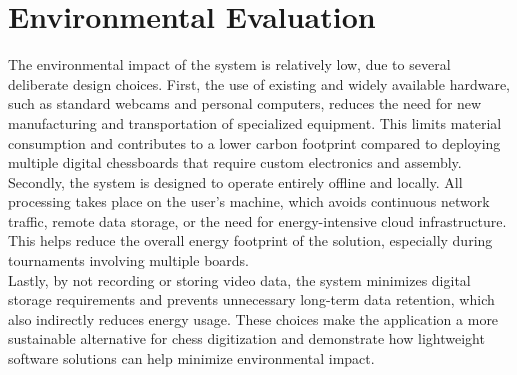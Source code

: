 \newpage

\section{Environmental Evaluation}
The environmental impact of the system is relatively low, due to several deliberate design choices. First, the use of existing and widely available hardware, such as standard webcams and personal computers, reduces the need for new manufacturing and transportation of specialized equipment. This limits material consumption and contributes to a lower carbon footprint compared to deploying multiple digital chessboards that require custom electronics and assembly. \\

Secondly, the system is designed to operate entirely offline and locally. All processing takes place on the user's machine, which avoids continuous network traffic, remote data storage, or the need for energy-intensive cloud infrastructure. This helps reduce the overall energy footprint of the solution, especially during tournaments involving multiple boards. \\

Lastly, by not recording or storing video data, the system minimizes digital storage requirements and prevents unnecessary long-term data retention, which also indirectly reduces energy usage. These choices make the application a more sustainable alternative for chess digitization and demonstrate how lightweight software solutions can help minimize environmental impact.
